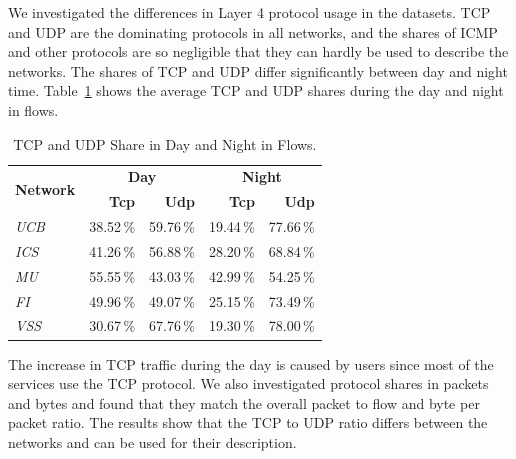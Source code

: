 We investigated the differences in Layer 4 protocol usage in the datasets. TCP and UDP are the dominating protocols in all networks, and the shares of ICMP and other protocols are so negligible that they can hardly be used to describe the networks. The shares of TCP and UDP differ significantly between day and night time. Table~\ref{tab:characterization-tcp-udp-share-flows-table} shows the average TCP and UDP shares during the day and night in flows.

\begin{table}[!t]
        \centering
        \renewcommand{\arraystretch}{1.1}
        \begin{tabular}{|l|r|r|r|r|} \hline
                \multirow{2}{*}{\textbf{Network}} & \multicolumn{2}{c|}{\textbf{Day}} & \multicolumn{2}{c|}{\textbf{Night}} \\ \cline{2-5}
                 & \textbf{Tcp} & \textbf{Udp} & \textbf{Tcp} & \textbf{Udp} \\ \hline
                \textit{UCB} & 38.52\,\% & 59.76\,\% & 19.44\,\% & 77.66\,\% \\  \hline
                \textit{ICS} & 41.26\,\% & 56.88\,\% & 28.20\,\% & 68.84\,\%\\  \hline
                \textit{MU} & 55.55\,\% & 43.03\,\% & 42.99\,\% & 54.25\,\% \\  \hline
                \textit{FI} & 49.96\,\% & 49.07\,\% & 25.15\,\% & 73.49\,\% \\  \hline
                \textit{VSS} & 30.67\,\% & 67.76\,\% & 19.30\,\% & 78.00\,\% \\  \hline
        \end{tabular}
        \caption{TCP and UDP Share in Day and Night in Flows.}
        \label{tab:characterization-tcp-udp-share-flows-table}
\end{table}

The increase in TCP traffic during the day is caused by users since most of the services use the TCP protocol. We also investigated protocol shares in packets and bytes and found that they match the overall packet to flow and byte per packet ratio. The results show that the TCP to UDP ratio differs between the networks and can be used for their description.

